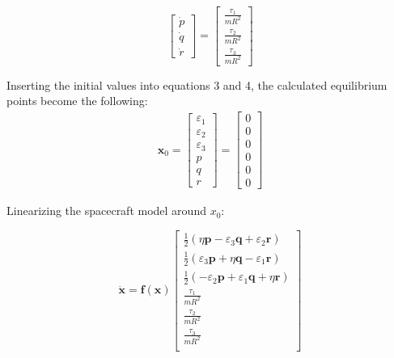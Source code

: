 \begin{equation}
    \begin{bmatrix}
    \dot{p} \\ \dot{q} \\ \dot{r}
    \end{bmatrix}
    =
    \begin{bmatrix}
    \frac{\tau_1}{mR^2} \\ \frac{\tau_2}{mR^2} \\ \frac{\tau_3}{mR^2} 
    \end{bmatrix}
\end{equation}




Inserting the initial values into equations 3 and 4, the calculated equilibrium points become the following: 
\begin{align*}
    \mathbf{x}_0 =
    \begin{bmatrix}
        \varepsilon_1 \\ \varepsilon_2 \\ \varepsilon_3 \\p \\ q \\ r 
    \end{bmatrix}
    = 
    \begin{bmatrix}
        0 \\ 0 \\ 0 \\ 0 \\ 0 \\ 0
    \end{bmatrix}
\end{align*}

Linearizing the spacecraft model around $x_0$: 

\begin{equation}
    \dot{\mathbf{x}} = \mathbf{f(x)}
    \begin{bmatrix}
        \frac{1}{2}(\eta \mathbf{p} -\varepsilon_3 \mathbf{q} + \varepsilon_2 \mathbf{r}) \\
        \frac{1}{2}(\varepsilon_3 \mathbf{p} + \eta \mathbf{q}  - \varepsilon_1 \mathbf{r})\\
        \frac{1}{2}(-\varepsilon_2 \mathbf{p} +\varepsilon_1 \mathbf{q} + \eta \mathbf{r}) \\
        \frac{\tau_1}{mR^2}\\
        \frac{\tau_2}{mR^2}\\
        \frac{\tau_3}{mR^2}\\
    \end{bmatrix} 
\end{equation}


